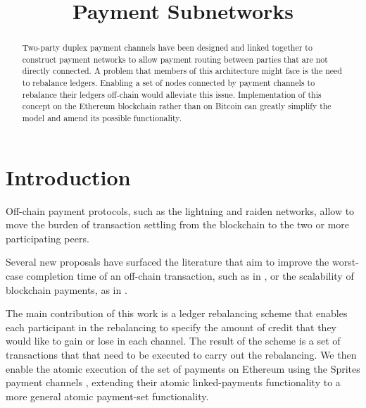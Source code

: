 \documentclass[12pt]{article}
\title{Payment Subnetworks\vspace{-4.5em}}
\date{}
\author{}
\begin{document}
\maketitle
\begin{abstract}
Two-party duplex payment channels have been designed and linked together to construct payment networks to allow payment routing between parties that are not directly connected. A problem that members of this architecture might face is the need to rebalance ledgers. Enabling a set of nodes connected by payment channels to rebalance their ledgers off-chain would alleviate this issue. Implementation of this concept on the Ethereum blockchain rather than on Bitcoin can greatly simplify the model and amend its possible functionality.
\end{abstract}

\section{Introduction}
Off-chain payment protocols, such as the lightning \cite{lightning} and raiden \cite{raiden} networks, allow to move the burden of transaction settling from the blockchain to the two or more participating peers. 

Several new proposals have surfaced the literature that aim to improve the worst-case completion time of an off-chain transaction, such as in \cite{sprites}, or the scalability of blockchain payments, as in \cite{scale}.

The main contribution of this work is a ledger rebalancing scheme that enables each participant in the rebalancing to specify the amount of credit that they would like to gain or lose in each channel. The result of the scheme is a set of transactions that that need to be executed to carry out the rebalancing. We then enable the atomic execution of the set of payments on Ethereum using the Sprites payment channels \cite{sprites}, extending their atomic linked-payments functionality to a more general atomic payment-set functionality.

\end{document}

